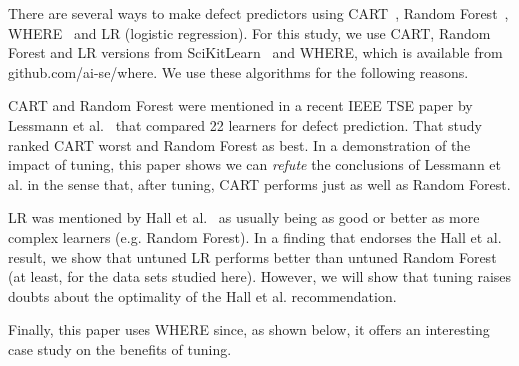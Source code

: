 \documentclass[smallextended]{svjour3}
\begin{document}
There are several ways to make defect predictors
using  CART~\cite{brieman00}, Random Forest~\cite{breiman84}, 
 WHERE~\cite{menzies2013local} and LR (logistic regression).
For this study, we use CART, Random Forest and LR versions  from 
SciKitLearn~\cite{scikit-learn} and
WHERE, which is available from
github.com/ai-se/where. 
 We use  these algorithms for the following reasons.
 
CART and Random Forest were mentioned in
a recent IEEE TSE paper by Lessmann et al.~\cite{lessmann2008benchmarking} that compared 22  
learners for  defect prediction.
That study ranked  CART  worst  and Random Forest as best.
In a demonstration of the impact of tuning,
this paper shows  we can {\em refute} the conclusions of  Lessmann et al.
in the sense that, after tuning,
CART
performs just as well as
 Random Forest.

LR was  mentioned by Hall et al.~\cite{hall11}
as usually being as good or better as more complex learners (e.g.
Random Forest). In a finding that endorses the Hall et al. result,
we show that untuned LR performs better than 
untuned Random Forest (at least, for the data sets studied here). However,
we will show that tuning raises doubts about the optimality of the
Hall et al. recommendation.

Finally,  this
 paper uses WHERE since, as shown below,
it offers an interesting case study on the benefits of tuning.
\end{document}
